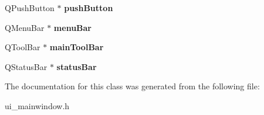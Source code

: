 \begin{DoxyCompactItemize}
\item 
\hypertarget{classUi__MainWindow_ad332d93084584930878f1daf5f84cdbf}{Q\-Push\-Button $\ast$ {\bfseries push\-Button}}\label{classUi__MainWindow_ad332d93084584930878f1daf5f84cdbf}

\item 
\hypertarget{classUi__MainWindow_a2be1c24ec9adfca18e1dcc951931457f}{Q\-Menu\-Bar $\ast$ {\bfseries menu\-Bar}}\label{classUi__MainWindow_a2be1c24ec9adfca18e1dcc951931457f}

\item 
\hypertarget{classUi__MainWindow_a5172877001c8c7b4e0f6de50421867d1}{Q\-Tool\-Bar $\ast$ {\bfseries main\-Tool\-Bar}}\label{classUi__MainWindow_a5172877001c8c7b4e0f6de50421867d1}

\item 
\hypertarget{classUi__MainWindow_a50fa481337604bcc8bf68de18ab16ecd}{Q\-Status\-Bar $\ast$ {\bfseries status\-Bar}}\label{classUi__MainWindow_a50fa481337604bcc8bf68de18ab16ecd}

\end{DoxyCompactItemize}


The documentation for this class was generated from the following file\-:\begin{DoxyCompactItemize}
\item 
ui\-\_\-mainwindow.\-h\end{DoxyCompactItemize}
